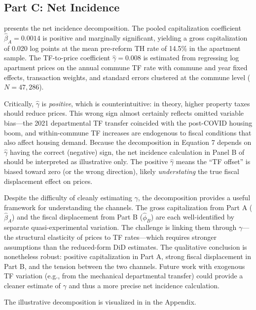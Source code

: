 \documentclass[12pt]{article}
\begin{document}
\subsection{Part C: Net Incidence}

 presents the net incidence decomposition. The pooled capitalization coefficient $\hat\beta_A = 0.0014$ is positive and marginally significant, yielding a gross capitalization of 0.020 log points at the mean pre-reform TH rate of 14.5\% in the apartment sample. The TF-to-price coefficient $\hat\gamma = 0.008$ is estimated from regressing log apartment prices on the annual commune TF rate with commune and year fixed effects, transaction weights, and standard errors clustered at the commune level ($N = 47{,}286$).

Critically, $\hat\gamma$ is \emph{positive}, which is counterintuitive: in theory, higher property taxes should reduce prices. This wrong sign almost certainly reflects omitted variable bias---the 2021 departmental TF transfer coincided with the post-COVID housing boom, and within-commune TF increases are endogenous to fiscal conditions that also affect housing demand. Because the decomposition in Equation 7 depends on $\hat\gamma$ having the correct (negative) sign, the net incidence calculation in Panel B of  should be interpreted as illustrative only. The positive $\hat\gamma$ means the ``TF offset'' is biased toward zero (or the wrong direction), likely \emph{understating} the true fiscal displacement effect on prices.



Despite the difficulty of cleanly estimating $\gamma$, the decomposition provides a useful framework for understanding the channels. The gross capitalization from Part A ($\hat\beta_A$) and the fiscal displacement from Part B ($\hat\phi_B$) are each well-identified by separate quasi-experimental variation. The challenge is linking them through $\gamma$---the structural elasticity of prices to TF rates---which requires stronger assumptions than the reduced-form DiD estimates. The qualitative conclusion is nonetheless robust: positive capitalization in Part A, strong fiscal displacement in Part B, and the tension between the two channels. Future work with exogenous TF variation (e.g., from the mechanical departmental transfer) could provide a cleaner estimate of $\gamma$ and thus a more precise net incidence calculation.

The illustrative decomposition is visualized in  in the Appendix.
\end{document}
